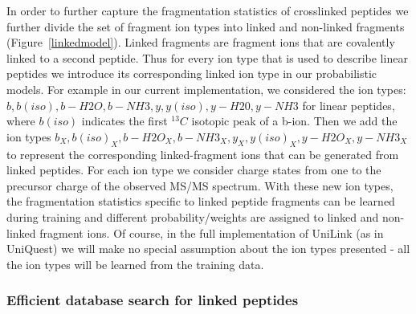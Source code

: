 \documentclass[arial,11pt]{article}
\begin{document}
In order to further capture the fragmentation statistics of crosslinked peptides we further divide the set of fragment ion types into linked and non-linked fragments (Figure~\ref{linkedmodel}). Linked fragments are fragment ions that are covalently linked to a second peptide.  Thus for every ion type that is used to describe linear peptides we introduce its corresponding linked ion type in our probabilistic models.  For example in our current implementation, we considered the ion types:  $b, b(iso), b-H2O, b-NH3, y, y(iso), y-H20, y-NH3$ for linear peptides, where $b(iso)$ indicates the first $^{13}C$ isotopic peak of a b-ion. Then we add the ion types $b_{X}, b(iso)_{X}, b-H2O_{X}, b-NH3_{X}, y_{X}, y(iso)_{X}, y-H2O_{X}, y-NH3_{X}$ to represent the corresponding linked-fragment ions that can be generated from linked peptides. For each ion type we consider charge states from one to the precursor charge of the observed MS/MS spectrum.  With these new ion types, the fragmentation statistics specific to linked peptide fragments can be learned during training and different probability/weights are assigned to linked and non-linked fragment ions.  Of course, in the full implementation of UniLink (as in UniQuest) we will make no special assumption about the ion types presented \-- all the ion types will be learned from the training data.

\subsubsection{Efficient database search for linked peptides}
\end{document}
